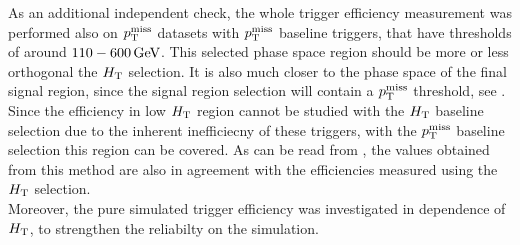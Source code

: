 As an additional independent check, the whole trigger efficiency measurement was performed also on $p_{\mathrm{T}}^\text{miss}$ datasets with $p_{\mathrm{T}}^\text{miss}$ baseline triggers, that have thresholds of around $110-600\,\text{Ge\hspace{-.08em}V}$. This selected phase space region should be more or less orthogonal the $H_{\mathrm{T}}$ selection. It is also much closer to the phase space of the final signal region, since the signal region selection will contain a $p_{\mathrm{T}}^\text{miss}$ threshold, see . Since the efficiency in low $H_{\mathrm{T}}$ region cannot be studied with the $H_{\mathrm{T}}$ baseline selection due to the inherent inefficiecny of these triggers, with the $p_{\mathrm{T}}^\text{miss}$ baseline selection this region can be covered. As can be read from , the values obtained from this method are also in agreement with the efficiencies measured using the $H_{\mathrm{T}}$ selection.\\
Moreover, the pure simulated trigger efficiency was investigated in dependence of $H_{\mathrm{T}}$, to strengthen the reliabilty
on the simulation.
